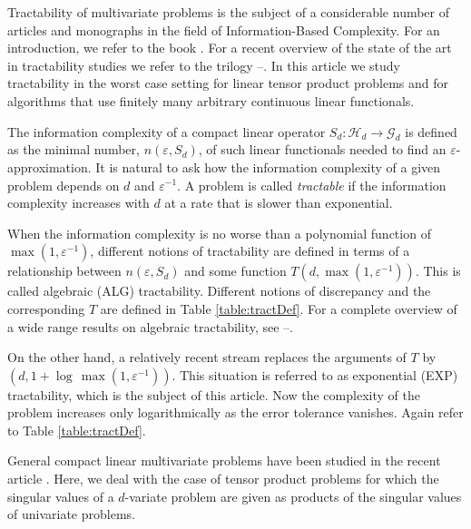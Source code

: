 \documentclass[graybox]{svmult}
\newcommand{\EXP}{\textup{EXP}\xspace}
\newcommand{\calG}{{\mathcal{G}}}
\newcommand{\calH}{{\mathcal{H}}}
\begin{document}
Tractability of multivariate problems is the subject of a considerable number 
of articles and monographs in the field of Information-Based Complexity.  For an introduction, we refer to the book \cite{TWW88}.  For a recent 
overview of the state of the art in tractability studies we refer to the 
trilogy \cite{NW08}--\cite{NW12}. In this article we study tractability in   
the worst case setting for linear tensor product problems and 
for algorithms that use finitely many   
arbitrary continuous linear functionals.    

The information complexity of a compact linear operator   
$S_d:\calH_d \to \calG_d$ is defined as the minimal number, $n(\varepsilon,S_d)$, of such   
linear functionals needed to find an $\varepsilon$-approximation. 
It is natural to ask how the information complexity of a given problem 
depends on $d$ and $\varepsilon^{-1}$. A problem is called \emph{tractable} if  the information complexity increases with $d$ at a rate that is slower than exponential.  

When the information complexity is no worse than a polynomial function of $\max(1,\varepsilon^{-1})$, different notions of tractability are defined in terms of a relationship between $n(\varepsilon,S_d)$ and some function $T(d,\max(1,\varepsilon^{-1}))$.  This is called algebraic (ALG) tractability.  Different notions of discrepancy and the corresponding $T$ are defined in Table \ref{table:tractDef}.  For a complete overview of a wide range results 
on algebraic tractability, see \cite{NW08}--\cite{NW12}. 

On the other hand, a relatively recent stream replaces the arguments of $T$ by $(d,1+\log\,\max(1,\varepsilon^{-1}))$. This situation is 
referred to as exponential (\EXP) tractability, which is the subject of this article. Now the complexity of the problem increases only logarithmically as the error tolerance vanishes.  Again refer to Table \ref{table:tractDef}. 

General compact linear multivariate problems have been studied 
in the recent article \cite{KW18}. Here, we deal with the case of    
tensor product problems for which the singular values of a $d$-variate problem 
are given as products of the singular values of univariate problems. 

\bigskip
\end{document}
